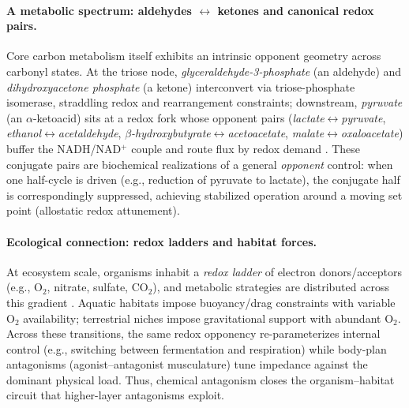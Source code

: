 \paragraph{A metabolic spectrum: aldehydes $\leftrightarrow$ ketones and canonical redox pairs.}
Core carbon metabolism itself exhibits an intrinsic opponent geometry across carbonyl states. At the triose node, \emph{glyceraldehyde-3-phosphate} (an aldehyde) and \emph{dihydroxyacetone phosphate} (a ketone) interconvert via triose-phosphate isomerase, straddling redox and rearrangement constraints; downstream, \emph{pyruvate} (an $\alpha$-ketoacid) sits at a redox fork whose opponent pairs (\emph{lactate}$\leftrightarrow$\emph{pyruvate}, \emph{ethanol}$\leftrightarrow$\emph{acetaldehyde}, \emph{$\beta$-hydroxybutyrate}$\leftrightarrow$\emph{acetoacetate}, \emph{malate}$\leftrightarrow$\emph{oxaloacetate}) buffer the NADH/NAD$^+$ couple and route flux by redox demand \citep{Berg2015_Biochemistry,Alberty2003_ThermoBiochem}. These conjugate pairs are biochemical realizations of a general \emph{opponent} control: when one half-cycle is driven (e.g., reduction of pyruvate to lactate), the conjugate half is correspondingly suppressed, achieving stabilized operation around a moving set point (allostatic redox attunement).

\paragraph{Ecological connection: redox ladders and habitat forces.}
At ecosystem scale, organisms inhabit a \emph{redox ladder} of electron donors/acceptors (e.g., O$_2$, nitrate, sulfate, CO$_2$), and metabolic strategies are distributed across this gradient \citep{Madigan2018_Brock,SternerElser2002_EcoStoichiometry}. Aquatic habitats impose buoyancy/drag constraints with variable O$_2$ availability; terrestrial niches impose gravitational support with abundant O$_2$. Across these transitions, the same redox opponency re-parameterizes internal control (e.g., switching between fermentation and respiration) while body-plan antagonisms (agonist--antagonist musculature) tune impedance against the dominant physical load. Thus, chemical antagonism closes the organism--habitat circuit that higher-layer antagonisms exploit.

